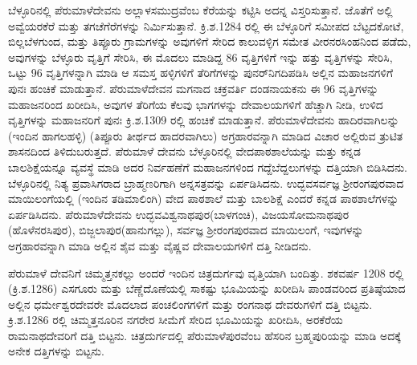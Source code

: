 ಬೆಳ್ಳೂರಿನಲ್ಲಿ ಪೆರುಮಾಳೆದೇವನು ಅಲ್ಲಾಳಸಮುದ್ರವೆಂಬ ಕೆರೆಯನ್ನು ಕಟ್ಟಿಸಿ ಅದನ್ನ ವಿಸ್ತರಿಸುತ್ತಾನೆ. ಜೊತೆಗೆ ಅಲ್ಲಿ ಅವ್ವೆಯರಕೆರೆ ಮತ್ತು ತಗಚೆಗೆರೆಗಳನ್ನು ನಿರ್ಮಿಸುತ್ತಾನೆ. ಕ್ರಿ.ಶ.1284 ರಲ್ಲಿ ಈ ಬೆಳ್ಳೂರಿಗೆ ಸಮೀಪದ ಬೆಟ್ಟದಕೋಟೆ, ಬಿಲ್ಲಬೆಳಗುಂದ, ಮತ್ತು ತಿಪ್ಪೂರು ಗ್ರಾಮಗಳನ್ನು ಅವುಗಳಿಗೆ ಸೇರಿದ ಕಾಲುವಳ್ಳಿಗ ಸಮೇತ ವೀರನರಸಿಂಹನಿಂದ ಪಡೆದು, ಅವುಗಳನ್ನು ಬೆಳ್ಳೂರು ವೃತ್ತಿಗೆ ಸೇರಿಸಿ, ಈ ಮೊದಲು ಮಾಡಿದ್ದ 86 ವೃತ್ತಿಗಳಿಗೆ ಇನ್ನು ಹತ್ತು ವೃತ್ತಿಗಳನ್ನು ಸೇರಿಸಿ, ಒಟ್ಟು 96 ವೃತ್ತಿಗಳನ್ನಾಗಿ ಮಾಡಿ ಆ ಸಮಸ್ತ ಹಳ್ಳಿಗಳಿಗೆ ತೆರಿಗೆಗಳನ್ನು ಪುನರ್​ನಿಗದಿಪಡಿಸಿ ಅಲ್ಲಿನ ಮಹಾಜನಗಳಿಗೆ ಪುನಃ ಹಂಚಿಕೆ ಮಾಡುತ್ತಾನೆ. ಪೆರುಮಾಳೆದೇವನ ಮಗನಾದ ಚಕ್ರವರ್ತಿ ದಂಡನಾಯಕನು ಈ 96 ವೃತ್ತಿಗಳನ್ನು ಮಹಾಜನರಿಂದ ಖರೀದಿಸಿ, ಅವುಗಳ ತೆರಿಗೆಯ ಕೆಲವು ಭಾಗಗಳನ್ನು ದೇವಾಲಯಗಳಿಗೆ ಹೆಚ್ಚಾಗಿ ನೀಡಿ, ಉಳಿದ ವೃತ್ತಿಗಳನ್ನು ಮಹಾಜನರಿಗೆ ಪುನಃ ಕ್ರಿ.ಶ.1309 ರಲ್ಲಿ ಹಂಚಿಕೆ ಮಾಡುತ್ತಾನೆ. ಪೆರುಮಾಳೆದೇವನು ಹಾದಿರವಾಗಿಲನ್ನು (ಇಂದಿನ ಹಾಗಲಹಳ್ಳಿ) (ತಿಪ್ಪೂರು ತೀರ್ಥದ ಹಾದರವಾಗಿಲು) ಅಗ್ರಹಾರವನ್ನಾಗಿ ಮಾಡಿದ ವಿಚಾರ ಅಲ್ಲಿರುವ ತ್ರುಟಿತ ಶಾಸನದಿಂದ ತಿಳಿದುಬರುತ್ತದೆ. ಪೆರುಮಾಳೆ ದೇವನು ಬೆಳ್ಳೂರಿನಲ್ಲಿ ವೇದಪಾಠಶಾಲೆಯನ್ನು ಮತ್ತು ಕನ್ನಡ ಬಾಲಶಿಕ್ಷೆಯನ್ನೂ ವ್ಯವಸ್ಥೆ ಮಾಡಿ ಅದರ ನಿರ್ವಹಣೆಗೆ ಮಹಾಜನಗಳಿಂದ ಗದ್ದೆಬೆದ್ದಲುಗಳನ್ನು ದತ್ತಿಯಾಗಿ ಬಿಡಿಸಿದನು. ಬೆಳ್ಳೂರಿನಲ್ಲಿ ನಿತ್ಯ ಪ್ರವಾಸಿಗರಾದ ಬ್ರಾಹ್ಮಣರಿಗಾಗಿ ಅನ್ನಸತ್ರವನ್ನು ಏರ್ಪಡಿಸಿದನು. ಉದ್ಭವಸರ್ವಜ್ಞ ಶ‍್ರೀರಂಗಪುರವಾದ ಮಾಯಿಲಂಗೆಯಲ್ಲಿ (ಇಂದಿನ ತಡಿಮಾಲಿಂಗಿ) ವೇದ ಪಾಠಶಾಲೆ ಮತ್ತು ಬಾಲಶಿಕ್ಷೆ ಎಂದರೆ ಕನ್ನಡ ಪಾಠಶಾಲೆಗಳನ್ನು ಏರ್ಪಡಿಸಿದನು. ಪೆರುಮಾಳೆದೇವನು ಉದ್ಭವವಿಶ್ವನಾಥಪುರ(ಬಾಳಗಂಚಿ), ವಿಜಯಸೋಮನಾಥಪುರ (ಹೊಳೆನರಸಿಪುರ), ಬಿಜ್ಜಲಾಪುರ(ಹಾನುಗಲ್ಲು), ಸರ್ವಜ್ಞ ಶ‍್ರೀರಂಗಪುರವಾದ ಮಾಯಿಲಂಗೆ, ಇವುಗಳನ್ನು ಅಗ್ರಹಾರವನ್ನಾಗಿ ಮಾಡಿ ಅಲ್ಲಿನ ಶೈವ ಮತ್ತು ವೈಷ್ಣವ ದೇವಾಲಯಗಳಿಗೆ ದತ್ತಿ ನೀಡಿದನು.

ಪೆರುಮಾಳೆ ದೇವನಿಗೆ ಚಿಮ್ಮತ್ತನಕಲ್ಲು ಅಂದರೆ ಇಂದಿನ ಚಿತ್ರದುರ್ಗವು ವೃತ್ತಿಯಾಗಿ ಬಂದಿತ್ತು. ಶಕವರ್ಷ 1208 ರಲ್ಲಿ (ಕ್ರಿ.ಶ.1286) ಎಸಗೂರು ಮತ್ತು ಬೆಣ್ಣೆದೊಣೆಯಲ್ಲಿ ಸಾಕಷ್ಟು ಭೂಮಿಯನ್ನು ಖರೀದಿಸಿ ಪಾಂಡವರಿಂದ ಪ್ರತಿಷ್ಠೆಯಾದ ಅಲ್ಲಿನ ಧರ್ಮೇಶ್ವರದೇವರೇ ಮೊದಲಾದ ಪಂಚಲಿಂಗಗಳಿಗೆ ಮತ್ತು ರಂಗನಾಥ ದೇವರುಗಳಿಗೆ ದತ್ತಿ ಬಿಟ್ಟನು. ಕ್ರಿ.ಶ.1286 ರಲ್ಲಿ ಚಿಮ್ಮತ್ತನೂರಿನ ನಗರೇರ ಸೀಮೆಗೆ ಸೇರಿದ ಭೂಮಿಯನ್ನು ಖರೀದಿಸಿ, ಅರಕೆರೆಯ ರಾಮನಾಥದೇವರಿಗೆ ದತ್ತಿ ಬಿಟ್ಟನು. ಚಿತ್ರದುರ್ಗದಲ್ಲಿ ಪೆರುಮಾಳೆಪುರವೆಂಬ ಹೆಸರಿನ ಬ್ರಹ್ಮಪುರಿಯನ್ನು ಮಾಡಿ ಅದಕ್ಕೆ ಅನೇಕ ದತ್ತಿಗಳನ್ನು ಬಿಟ್ಟನು.

